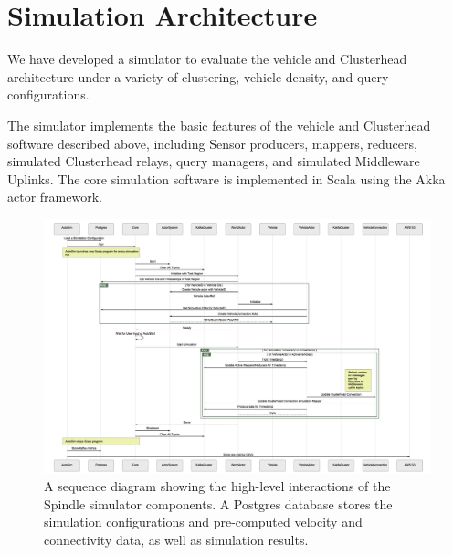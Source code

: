 \documentclass{thesis}
\begin{document}


\section{Simulation Architecture}
    We have developed a simulator to evaluate the vehicle and Clusterhead architecture under a variety of clustering,
    vehicle density, and query configurations.

    The simulator implements the basic features of the vehicle and Clusterhead software described above, including
    Sensor producers, mappers, reducers, simulated Clusterhead relays, query managers, and simulated Middleware Uplinks.
    The core simulation software is implemented in Scala using the Akka actor framework.
    \begin{figure}
        \centering
        \includegraphics[width=\textheight]{binImages/simulator-sequence.png}
        \caption{A sequence diagram showing the high-level interactions of
        the Spindle simulator components. A Postgres database stores the
        simulation configurations and pre-computed velocity and connectivity
        data, as well as simulation results.}
    \end{figure}
\end{document}
